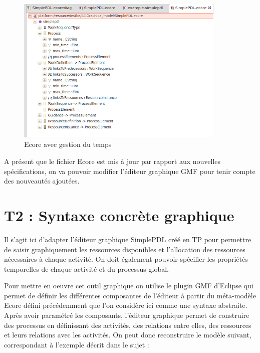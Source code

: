 \documentclass{report}
\begin{document}
\begin{figure}[!h] 
\begin{center}
\includegraphics[width=10cm]{Capture-5.png}
\caption{Ecore avec gestion du temps} 
\label{img1} 
\end{center}
\end{figure} 

A présent que le fichier Ecore est mis à jour par rapport aux nouvelles spécifications, on va pouvoir modifier l'éditeur graphique GMF pour tenir compte des nouveautés ajoutées.

\newpage

\section{T2 : Syntaxe concrète graphique}

Il s'agit ici d'adapter l’éditeur graphique SimplePDL créé en TP pour permettre de saisir graphiquement les ressources disponibles et l’allocation des ressources nécessaires à chaque activité. On doit également pouvoir spécifier les propriétés temporelles de chaque activité et du processus global.

Pour mettre en oeuvre cet outil graphique on utilise le plugin GMF d'Eclipse qui permet de définir les différentes composantes de l'éditeur à partir du méta-modèle Ecore défini précédemment que l'on considère ici comme une syntaxe abstraite. Après avoir paramétré les composants, l'éditeur graphique permet de construire des processus en définissant des activités, des relations entre elles, des ressources et leurs relations avec les activités. On peut donc reconstruire le modèle suivant, correspondant à l'exemple décrit dans le sujet :
\end{document}

